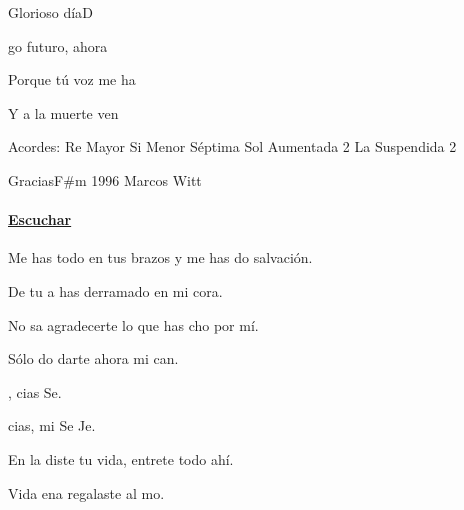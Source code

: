\documentclass[12pt, spanish]{book}
\begin{document}
\begin{song}{Glorioso día}{D}
\begin{SBOpGroup}
            go futuro, ahora 

            Porque tú voz me ha

            Y a la muerte ven
        \end{SBOpGroup}

        \ifChordBk
        \begin{SBOpGroup}
            Acordes:\break
            \upchord{\D}\qquad Re Mayor \hfill
            \upchord{\Bmseven}\qquad Si Menor S\'eptima \hfill\null\break
            \upchord{\Gtwo}\qquad Sol Aumentada 2 \hfill
            \upchord{\Asustwo}\qquad La Suspendida 2 \hfill\null\break
        \end{SBOpGroup}
        \fi
    \end{song}

    \begin{song}{Gracias}{F\#m}
    {1996} %
    {Marcos Witt}
    {} %
    {}
        \ifChordBk
            \paragraph{\mbox{}\hfill\protect\href{https://open.spotify.com/intl-es/track/1jnUCPGWdEXtjTaviVG9E9}{Escuchar}\mbox{}\hfill}
        \fi

        \begin{SBOpGroup}
            Me has todo en tus brazos y me has do salvación.

            De tu a has derramado en mi cora.

            No sa agradecerte lo que has cho por mí.

            Sólo do darte ahora mi can.
        \end{SBOpGroup}

        \begin{SBChorus}
            , cias Se.

            cias, mi Se Je.
        \end{SBChorus}

        \begin{SBOpGroup}
            En la  diste tu vida, entrete todo ahí.

            Vida ena regalaste al mo.


\end{SBOpGroup}
\end{song}
\end{document}
